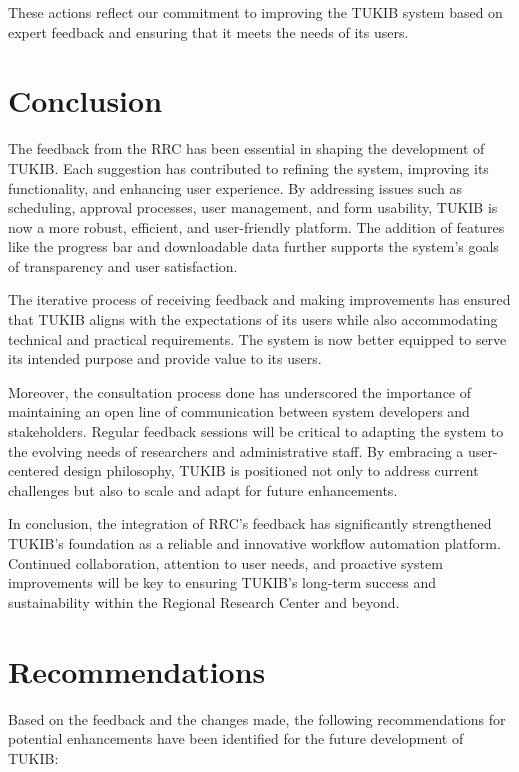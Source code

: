 These actions reflect our commitment to improving the TUKIB system based on expert feedback and ensuring that it meets the needs of its users.

\section{Conclusion}
The feedback from the RRC has been essential in shaping the development of TUKIB. Each suggestion has contributed to refining the system, improving its functionality, and enhancing user experience. By addressing issues such as scheduling, approval processes, user management, and form usability, TUKIB is now a more robust, efficient, and user-friendly platform. The addition of features like the progress bar and downloadable data further supports the system’s goals of transparency and user satisfaction.

The iterative process of receiving feedback and making improvements has ensured that TUKIB aligns with the expectations of its users while also accommodating technical and practical requirements. The system is now better equipped to serve its intended purpose and provide value to its users.

Moreover, the consultation process done has underscored the importance of maintaining an open line of communication between system developers and stakeholders. Regular feedback sessions will be critical to adapting the system to the evolving needs of researchers and administrative staff. By embracing a user-centered design philosophy, TUKIB is positioned not only to address current challenges but also to scale and adapt for future enhancements.

In conclusion, the integration of RRC’s feedback has significantly strengthened TUKIB’s foundation as a reliable and innovative workflow automation platform. Continued collaboration, attention to user needs, and proactive system improvements will be key to ensuring TUKIB’s long-term success and sustainability within the Regional Research Center and beyond.

\section{Recommendations}
Based on the feedback and the changes made, the following recommendations for potential enhancements have been identified for the future development of TUKIB:

